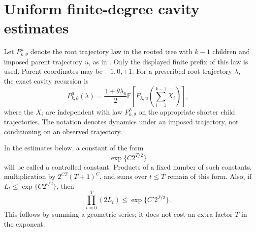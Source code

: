 \documentclass[11pt]{article}
\theoremstyle{remark}\newtheorem{remark}[theorem]{Remark}
\newcommand{\E}{\mathbb E}
\begin{document}
\section{Uniform finite-degree cavity estimates}
Let $P_{k,\theta}^{u}$ denote the root trajectory law in the rooted tree
with $k-1$ children and imposed parent trajectory $u$, as in \cite{KM}.
Only the displayed finite prefix of this law is used. Parent coordinates
may be $-1,0,+1$. For a prescribed root trajectory $\lambda$, the exact
cavity recursion is
\begin{equation}\label{eq:exact-cavity}
 P_{k,\theta}^{u}(\lambda)
 =\frac{1+\theta\lambda_0}{2}
   \E\left[F_{\lambda,u}\left(\sum_{i=1}^{k-1}X_i\right)\right],
\end{equation}
where the $X_i$ are independent with law $P_{k,\theta}^{\lambda}$ on the
appropriate shorter child trajectories. The notation denotes dynamics
under an imposed trajectory, not conditioning on an observed trajectory.

In the estimates below, a constant of the form
\begin{equation}\label{eq:controlled-constant}
 \exp\{C2^{T/2}\}
\end{equation}
will be called a controlled constant. Products of a fixed number of such
constants, multiplication by $2^{CT}(T+1)^C$, and sums over $t\le T$
remain of this form. Also, if
$L_t\le\exp\{C2^{t/2}\}$, then
\begin{equation}\label{eq:product-constant}
 \prod_{t=0}^T(2L_t)
 \le\exp\{C'2^{T/2}\}.
\end{equation}
This follows by summing a geometric series; it does not cost an extra
factor $T$ in the exponent.
\end{document}
